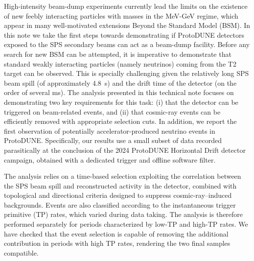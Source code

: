 
High-intensity beam-dump experiments currently lead the limits on the existence of new feebly interacting particles with masses in the MeV-GeV regime, which appear in many well-motivated  extensions Beyond the Standard Model (BSM).   
%
In this note we take the first steps towards demonstrating if ProtoDUNE detectors exposed to the SPS secondary beams can act as a beam-dump facility. Before any search for new BSM can be attempted, it is imperative to demonstrate that standard weakly interacting particles (namely neutrinos) coming from the T2 target can be observed. This is specially challenging given the relatively long SPS beam spill (of approximately 4.8~s) and the drift time of the detector (on the order of several ms).
The analysis presented in this technical note focuses on demonstrating two key requirements for this task: (i) that the detector can be triggered on beam-related events, and (ii) that cosmic-ray events can be efficiently removed with appropriate selection cuts. In addition, we report the first observation of potentially accelerator-produced neutrino events in ProtoDUNE. Specifically, our results use a small subset of data recorded parasitically at the conclusion of the 2024 ProtoDUNE Horizontal Drift detector campaign, obtained with a dedicated trigger and offline software filter. 

The analysis relies on a time-based selection exploiting the correlation between the SPS beam spill and reconstructed activity in the detector, combined with topological and directional criteria designed to suppress cosmic-ray–induced backgrounds. Events are also classified according to the instantaneous trigger primitive (TP) rates, which varied during data taking. The analysis is therefore performed separately for periods characterized by low-TP and high-TP rates. We have checked that the event selection is capable of removing the additional contribution in periods with high TP rates, rendering the two final samples compatible. 

